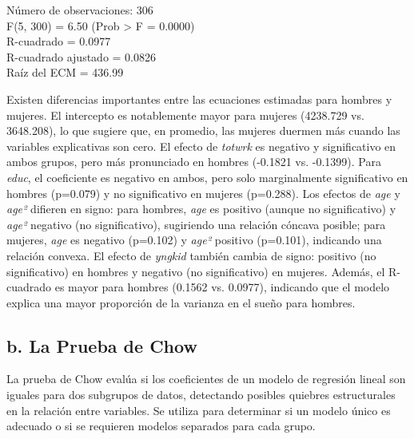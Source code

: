 \documentclass[12pt]{article}
\begin{document}
Número de observaciones: 306 \\
F(5, 300) = 6.50 (Prob > F = 0.0000) \\
R-cuadrado = 0.0977 \\
R-cuadrado ajustado = 0.0826 \\
Raíz del ECM = 436.99

Existen diferencias importantes entre las ecuaciones estimadas para hombres y mujeres. El intercepto es notablemente mayor para mujeres (4238.729 vs. 3648.208), lo que sugiere que, en promedio, las mujeres duermen más cuando las variables explicativas son cero. El efecto de \textit{totwrk} es negativo y significativo en ambos grupos, pero más pronunciado en hombres (-0.1821 vs. -0.1399). Para \textit{educ}, el coeficiente es negativo en ambos, pero solo marginalmente significativo en hombres (p=0.079) y no significativo en mujeres (p=0.288). Los efectos de \textit{age} y \textit{age²} difieren en signo: para hombres, \textit{age} es positivo (aunque no significativo) y \textit{age²} negativo (no significativo), sugiriendo una relación cóncava posible; para mujeres, \textit{age} es negativo (p=0.102) y \textit{age²} positivo (p=0.101), indicando una relación convexa. El efecto de \textit{yngkid} también cambia de signo: positivo (no significativo) en hombres y negativo (no significativo) en mujeres. Además, el R-cuadrado es mayor para hombres (0.1562 vs. 0.0977), indicando que el modelo explica una mayor proporción de la varianza en el sueño para hombres.

\subsection*{b. La Prueba de Chow}

La prueba de Chow evalúa si los coeficientes de un modelo de regresión lineal son iguales para dos subgrupos de datos, detectando posibles quiebres estructurales en la relación entre variables. Se utiliza para determinar si un modelo único es adecuado o si se requieren modelos separados para cada grupo.

\end{document}
